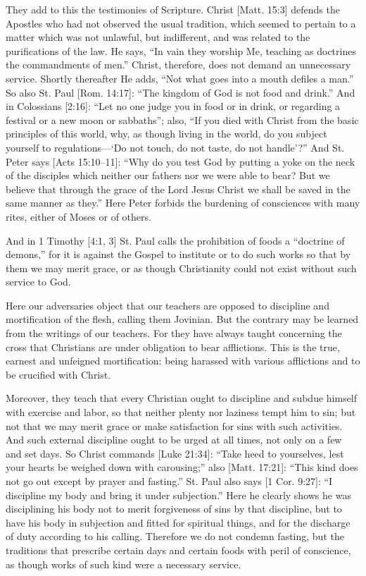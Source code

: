 They add to this the testimonies of Scripture. Christ [Matt. 15:3] defends the Apostles who had not observed the usual tradition, which seemed to pertain to a matter which was not unlawful, but indifferent, and was related to the purifications of the law. He says, “In vain they worship Me, teaching as doctrines the commandments of men.” Christ, therefore, does not demand an unnecessary service. Shortly thereafter He adds, “Not what goes into a mouth defiles a man.” So also St. Paul [Rom. 14:17]: “The kingdom of God is not food and drink.” And in Colossians [2:16]: “Let no one judge you in food or in drink, or regarding a festival or a new moon or sabbaths”; also, “If you died with Christ from the basic principles of this world, why, as though living in the world, do you subject yourself to regulations—‘Do not touch, do not taste, do not handle’?” And St. Peter says [Acts 15:10–11]: “Why do you test God by putting a yoke on the neck of the disciples which neither our fathers nor we were able to bear? But we believe that through the grace of the Lord Jesus Christ we shall be saved in the same manner as they.” Here Peter forbids the burdening of consciences with many rites, either of Moses or of others.

And in 1 Timothy [4:1, 3] St. Paul calls the prohibition of foods a “doctrine of demons,” for it is against the Gospel to institute or to do such works so that by them we may merit grace, or as though Christianity could not exist without such service to God.

Here our adversaries object that our teachers are opposed to discipline and mortification of the flesh, calling them Jovinian. But the contrary may be learned from the writings of our teachers. For they have always taught concerning the cross that Christians are under obligation to bear afflictions. This is the true, earnest and unfeigned mortification: being harassed with various afflictions and to be crucified with Christ.

Moreover, they teach that every Christian ought to discipline and subdue himself with exercise and labor, so that neither plenty nor laziness tempt him to sin; but not that we may merit grace or make satisfaction for sins with such activities. And such external discipline ought to be urged at all times, not only on a few and set days. So Christ commands [Luke 21:34]: “Take heed to yourselves, lest your hearts be weighed down with carousing;” also [Matt. 17:21]: “This kind does not go out except by prayer and fasting.” St. Paul also says [1 Cor. 9:27]: “I discipline my body and bring it under subjection.” Here he clearly shows he was disciplining his body not to merit forgiveness of sins by that discipline, but to have his body in subjection and fitted for spiritual things, and for the discharge of duty according to his calling. Therefore we do not condemn fasting, but the traditions that prescribe certain days and certain foods with peril of conscience, as though works of such kind were a necessary service.

